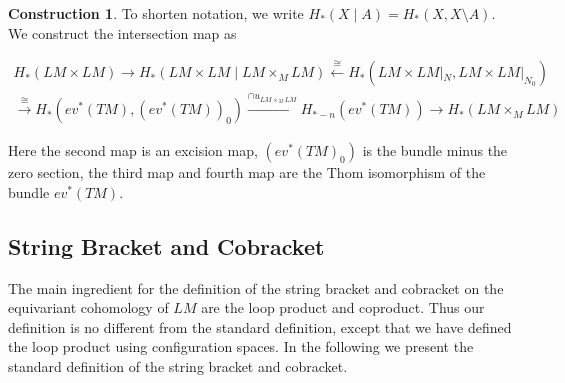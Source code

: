 \documentclass{scrartcl}
\theoremstyle{plain}
\theoremstyle{definition}
\newtheorem{construction}[theorem]{Construction}
\newcommand{\iso}{\cong}
\let\xto\xrightarrow
\let\xfrom\xleftarrow
\begin{document}


\begin{construction}
To shorten notation, we write $H_*(X \mid A) = H_*(X, X\setminus A)$. We construct the intersection map as 

\begin{align*}
    H_*(LM\times LM) \to H_*(LM\times LM \mid LM\times_M LM) \xfrom{\iso} H_*(LM\times LM |_N, LM\times LM|_{N_0}) \\ \xto{\iso} H_*(ev^*(TM), (ev^*(TM))_0) \xto{\cap u_{LM\times_M LM}} H_{*-n}(ev^*(TM)) \to H_*(LM\times_M LM)
\end{align*}

Here the second map is an excision map, $(ev^*(TM)_0)$ is the bundle minus the zero section, the third map and fourth map are the Thom isomorphism of the bundle $ev^*(TM)$.

\end{construction}


\subsection{String Bracket and Cobracket}
The main ingredient for the definition of the string bracket and cobracket on the equivariant cohomology of $LM$ are the loop product and coproduct. Thus our definition is no different from the standard definition, except that we have defined the loop product using configuration spaces. In the following we present the standard definition of the string bracket and cobracket.
\end{document}
